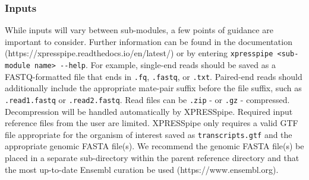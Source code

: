 \documentclass[10pt, oneside]{article}
\begin{document}
\subsubsection{Inputs}
While inputs will vary between sub-modules, a few points of guidance are important to consider. Further information can be found in the documentation (https://xpresspipe.readthedocs.io/en/latest/) or by entering \texttt{xpresspipe \textless sub-module name\textgreater \ -{}-help}. For example, single-end reads should be saved as a FASTQ-formatted file that ends in \texttt{.fq}, \texttt{.fastq}, or \texttt{.txt}. Paired-end reads should additionally include the appropriate mate-pair suffix before the file suffix, such as \texttt{.read1.fastq} or \texttt{.read2.fastq}. Read files can be \texttt{.zip} - or \texttt{.gz} - compressed. Decompression will be handled automatically by XPRESSpipe. Required input reference files from the user are limited. XPRESSpipe only requires a valid GTF file appropriate for the organism of interest saved as \texttt{transcripts.gtf} and the appropriate genomic FASTA file(s). We recommend the genomic FASTA file(s) be placed in a separate sub-directory within the parent reference directory and that the most up-to-date Ensembl curation be used (https://www.ensembl.org).
\end{document}
